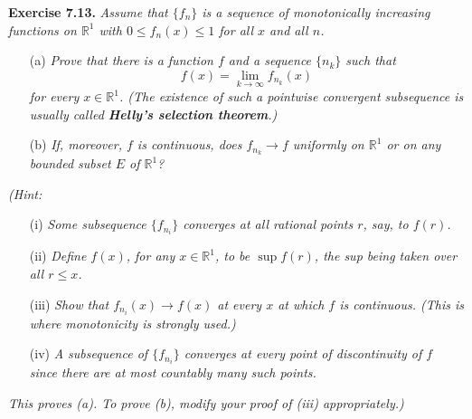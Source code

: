 \documentclass{article}
\begin{document}



\textbf{Exercise 7.13.}
\emph{Assume that $\{f_n\}$ is a sequence of monotonically increasing functions on $\mathbb{R}^1$
with $0 \leq  f_n(x) \leq 1$ for all $x$ and all $n$.}
\begin{enumerate}
\item[(a)]
  \emph{Prove that there is a function $f$ and a sequence $\{n_k\}$ such that
  \[
    f(x) = \lim_{k \to \infty} f_{n_k}(x)
  \]
  for every $x \in \mathbb{R}^1$.
  (The existence of such a pointwise convergent subsequence is usually
  called \textbf{Helly's selection theorem}.)}

\item[(b)]
  \emph{If, moreover, $f$ is continuous, does $f_{n_k} \to f$ uniformly on $\mathbb{R}^1$
  or on any bounded subset $E$ of $\mathbb{R}^1$?}
\end{enumerate}

\emph{(Hint:}
\begin{enumerate}
\item[(i)]
\emph{Some subsequence $\{f_{n_i}\}$ converges at all rational points $r$, say, to $f(r)$.}

\item[(ii)]
\emph{Define $f(x)$, for any $x \in \mathbb{R}^1$, to be $\sup f(r)$,
the sup being taken over all $r \leq x$.}

\item[(iii)]
\emph{Show that $f_{n_i}(x) \to f(x)$ at every $x$ at which $f$ is continuous.
(This is where monotonicity is strongly used.)}

\item[(iv)]
\emph{A subsequence of $\{f_{n_i}\}$ converges at every point of discontinuity of $f$
since there are at most countably many such points.}

\end{enumerate}
\emph{This proves (a).
To prove (b), modify your proof of (iii) appropriately.)} \\
\end{document}
